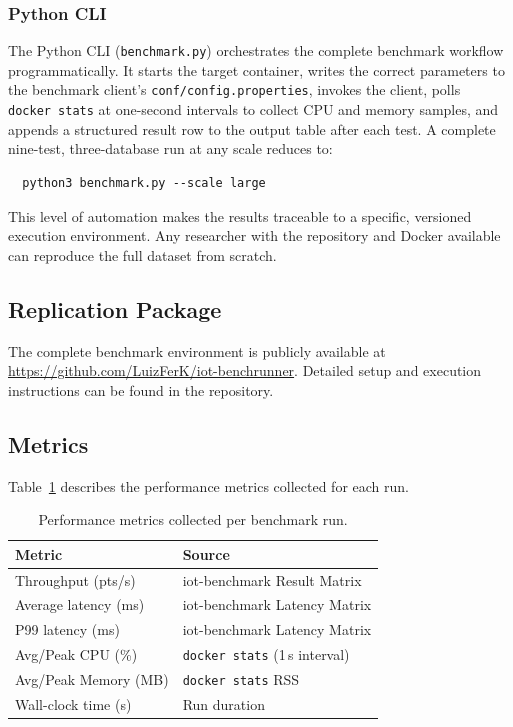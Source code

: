 \subsubsection{Python CLI}

The Python CLI (\texttt{benchmark.py}) orchestrates the complete benchmark workflow
programmatically. It starts the target container, writes the correct parameters to
the benchmark client's \texttt{conf/config.properties}, invokes the client, polls
\texttt{docker~stats} at one-second intervals to collect CPU and memory samples, and appends
a structured result row to the output table after each test. A complete nine-test,
three-database run at any scale reduces to:

\begin{verbatim}
  python3 benchmark.py --scale large
\end{verbatim}

This level of automation makes the results traceable to a specific, versioned execution
environment. Any researcher with the repository and Docker available can reproduce the full
dataset from scratch.

\subsection{Replication Package}
\label{sec:replication}

The complete benchmark environment is publicly available at
\url{https://github.com/LuizFerK/iot-benchrunner}. Detailed setup and
execution instructions can be found in the repository.

\subsection{Metrics}
\label{sec:metrics}

Table~\ref{tab:metrics} describes the performance metrics collected for each run.

\begin{table}[t]
  \centering
  \caption{Performance metrics collected per benchmark run.}
  \label{tab:metrics}
  \begin{tabular}{ll}
    \hline
    \textbf{Metric} & \textbf{Source} \\
    \hline
    Throughput (pts/s)    & iot-benchmark Result Matrix \\
    Average latency (ms)  & iot-benchmark Latency Matrix \\
    P99 latency (ms)      & iot-benchmark Latency Matrix \\
    Avg/Peak CPU (\%)     & \texttt{docker stats} (1\,s interval) \\
    Avg/Peak Memory (MB)  & \texttt{docker stats} RSS \\
    Wall-clock time (s)   & Run duration \\
    \hline
  \end{tabular}
\end{table}

